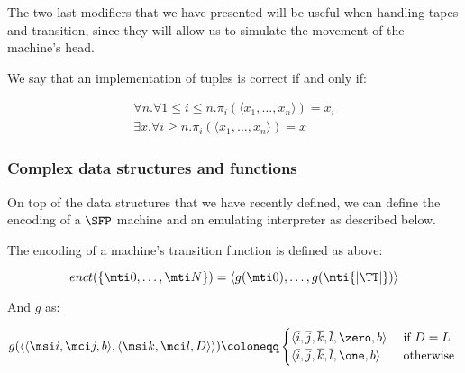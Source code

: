 The two last modifiers that we have presented will be useful when handling tapes and transition, since they will allow us to simulate the movement of the machine's head.

\begin{defn}
We say that an implementation of tuples is correct if and only if:

\begin{align*}
\forall n.\forall 1\le i \le n. \pi_i(\langle x_1, \ldots, x_n\rangle)= x_i\\
\exists x. \forall i \ge n. \pi_i(\langle x_1, \ldots, x_n\rangle)= x
\end{align*}
\end{defn}

\begin{comment}
\begin{defn}[Belonging test on tuples]
We say that a belonging test on tuples $b$ is correct if and only if:

\begin{align*}
b(x, t)=1 \leftrightarrow t = \langle x_1, x_2, \ldots, x_n\rangle \land \exists i. x_i=x
\end{align*}
\end{defn}
\end{comment}

\subsubsection{Complex data structures and functions}
\label{sec:complexdataandfun}

On top of the data structures that we have recently defined, we can define the encoding of a $\SFP$ machine and an emulating interpreter as described below.

\begin{defn}
\label{defn:smencoding}
The encoding of a machine's transition function is defined as above:
\begin{comment}
The encoding of a stream machine is defined as the 4-uple build as follows:
\begin{align*}
\langle \QQ, \Sigma, \TT, \msi i\rangle \mapsto \langle \overline {|\QQ|}, \overline {|\Sigma|}, enct(\TT), \overline {i}\rangle
\end{align*}
\end{comment}
\[
enct(\{\mti 0, \ldots, \mti N\})=\langle g(\mti 0), \ldots, g(\mti {{|\TT|}})\rangle
\]

And $g$ as:

\[
g(\langle \langle \msi i, \mci j, b\rangle, \langle \msi k, \mci l, D\rangle \rangle)\coloneqq\begin{cases}
\langle \overline i, \overline j, \overline k, \overline l, \zero, b\rangle & \text{ if } D=L\\
\langle \overline i, \overline j, \overline k,  \overline l, \one, b\rangle & \text{ otherwise }
\end{cases}
\]
\end{defn}

